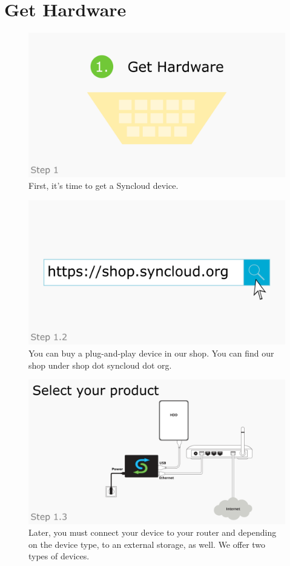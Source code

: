 \documentclass[a4paper,12pt]{article}
\begin{document}
\section{Get Hardware}

\begin{figure}[htbp!]
	\centering
	\includegraphics[width=0.7\linewidth]{../frames/3.png}
	\caption{First, it’s time to get a Syncloud device.}
	\label{fig:3}
\end{figure}

\begin{figure}[htbp!]
	\centering
	\includegraphics[width=0.7\linewidth]{../frames/13.png}
	\caption{You can buy a plug-and-play device in our shop. You can find our shop under shop dot syncloud dot org.}
	\label{fig:4}
\end{figure}

\begin{figure}[htbp!]
	\centering
	\includegraphics[width=0.7\linewidth]{../frames/14.png}
	\caption{Later, you must connect your device to your router and depending on the device type, to an external storage, as well. We offer two types of devices.}
	\label{fig:5}
\end{figure}
\end{document}
